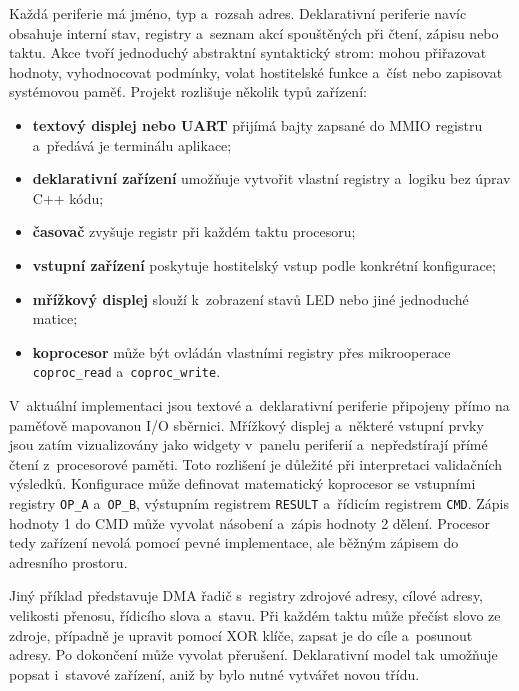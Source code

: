 \documentclass[hidelinks, 12pt]{article}%
\begin{document}
Každá periferie má jméno, typ a~rozsah adres. Deklarativní periferie navíc obsahuje interní stav, registry a~seznam akcí spouštěných při čtení, zápisu nebo taktu. Akce tvoří jednoduchý abstraktní syntaktický strom: mohou přiřazovat hodnoty, vyhodnocovat podmínky, volat hostitelské funkce a~číst nebo zapisovat systémovou paměť.
Projekt rozlišuje několik typů zařízení:
\begin{itemize}
\item \textbf{textový displej nebo UART} přijímá bajty zapsané do MMIO registru a~předává je terminálu aplikace;
\item \textbf{deklarativní zařízení} umožňuje vytvořit vlastní registry a~logiku bez úprav C++ kódu;
\item \textbf{časovač} zvyšuje registr při každém taktu procesoru;
\item \textbf{vstupní zařízení} poskytuje hostitelský vstup podle konkrétní konfigurace;
\item \textbf{mřížkový displej} slouží k~zobrazení stavů LED nebo jiné jednoduché matice;
\item \textbf{koprocesor} může být ovládán vlastními registry přes mikrooperace \texttt{coproc\_read} a~\texttt{coproc\_write}.
\end{itemize}

V~aktuální implementaci jsou textové a~deklarativní periferie připojeny přímo na paměťově mapovanou I/O sběrnici. Mřížkový displej a~některé vstupní prvky jsou zatím vizualizovány jako widgety v~panelu periferií a~nepředstírají přímé čtení z~procesorové paměti. Toto rozlišení je důležité při interpretaci validačních výsledků.
Konfigurace může definovat matematický koprocesor se vstupními registry \texttt{OP\_A} a~\texttt{OP\_B}, výstupním registrem \texttt{RESULT} a~řídicím registrem \texttt{CMD}. Zápis hodnoty 1 do CMD může vyvolat násobení a~zápis hodnoty 2 dělení. Procesor tedy zařízení nevolá pomocí pevné implementace, ale běžným zápisem do adresního prostoru.

Jiný příklad představuje DMA řadič s~registry zdrojové adresy, cílové adresy, velikosti přenosu, řídicího slova a~stavu. Při každém taktu může přečíst slovo ze zdroje, případně je upravit pomocí XOR klíče, zapsat je do cíle a~posunout adresy. Po dokončení může vyvolat přerušení. Deklarativní model tak umožňuje popsat i~stavové zařízení, aniž by bylo nutné vytvářet novou třídu.
\end{document}
